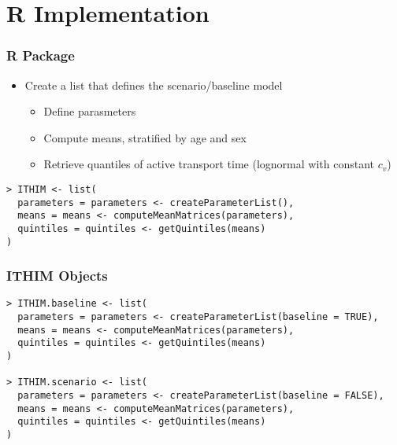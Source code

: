\documentclass[handout,13pt,compress,c]{beamer}
\newcommand{\bi}{\begin{itemize}}
\newcommand{\ei}{\end{itemize}}
\begin{document}
\section{R Implementation}
\begin{frame}[fragile]
\frametitle{R Package}
\bi
\item Create a list that defines the scenario/baseline model
\bi \item Define parasmeters \item Compute means, stratified by age and sex \item Retrieve quantiles of active transport time (lognormal with constant $c_v$)\ei
\ei
\begin{semiverbatim}
\begin{lstlisting}
> ITHIM <- list(
  parameters = parameters <- createParameterList(),
  means = means <- computeMeanMatrices(parameters),
  quintiles = quintiles <- getQuintiles(means)
)
\end{lstlisting}
\end{semiverbatim}
\end{frame}
\begin{frame}[fragile]
\frametitle{ITHIM Objects}
\begin{semiverbatim}
\begin{lstlisting}
> ITHIM.baseline <- list(
  parameters = parameters <- createParameterList(baseline = TRUE),
  means = means <- computeMeanMatrices(parameters),
  quintiles = quintiles <- getQuintiles(means)
)

> ITHIM.scenario <- list(
  parameters = parameters <- createParameterList(baseline = FALSE),
  means = means <- computeMeanMatrices(parameters),
  quintiles = quintiles <- getQuintiles(means)
)
\end{lstlisting}
\end{semiverbatim}
\end{frame}
\end{document}
